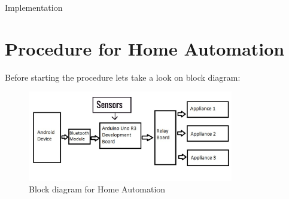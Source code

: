 \documentclass[12pt, oneside]{report}
\numberwithin{equation}{section}
\begin{document}
\begin{chapter}{Implementation}
%
%

\section{Procedure for Home Automation}
Before starting the procedure lets take a look on block diagram:
\begin{figure}[h]
\center
\includegraphics[width=0.8\textwidth]{block_diagram}
\caption{Block diagram for Home Automation}
\end{figure}


\end{chapter}
\end{document}
